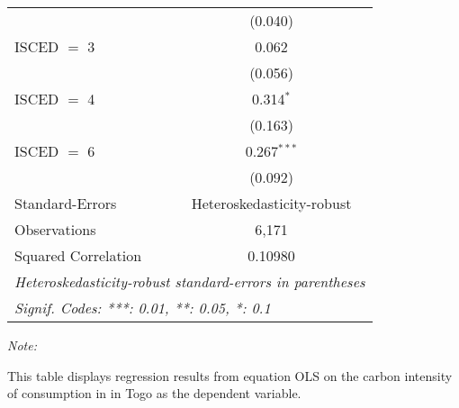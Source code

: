 \begin{table}[htbp!]
\begin{adjustbox}{width = 1\textwidth, max height = 0.95\textheight, center}
\begin{threeparttable}[b]
\begin{tabular}{lc}
                                & (0.040)\\   
            ISCED $=$ 3         & 0.062\\   
                                & (0.056)\\   
            ISCED $=$ 4         & 0.314$^{*}$\\   
                                & (0.163)\\   
            ISCED $=$ 6         & 0.267$^{***}$\\   
                                & (0.092)\\   
            \midrule 
            Standard-Errors     & Heteroskedasticity-robust \\   
            Observations        & 6,171\\  
            Squared Correlation & 0.10980\\  
            \midrule \midrule
            \multicolumn{2}{l}{\emph{Heteroskedasticity-robust standard-errors in parentheses}}\\
            \multicolumn{2}{l}{\emph{Signif. Codes: ***: 0.01, **: 0.05, *: 0.1}}\\
         \end{tabular}
         
         \begin{tablenotes}\item \medskip \textit{Note:}
            \item This table displays regression results from equation OLS on the carbon intensity of consumption in  in Togo as the dependent variable. 
         \end{tablenotes}
      \end{threeparttable}
   \end{adjustbox}
\end{table}


